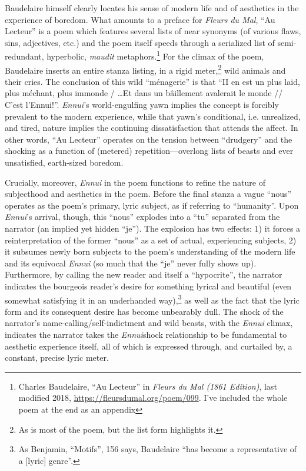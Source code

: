 \documentclass[12pt]{article}
\begin{document}
Baudelaire himself clearly locates his sense of modern life and of aesthetics in the experience of boredom. What amounts to a preface for \textit{Fleurs du Mal}, ``Au Lecteur'' is a poem which features several lists of near synonyms (of various flaws, sins, adjectives, etc.) and the poem itself speeds through a serialized list of semi-redundant, hyperbolic, \textit{maudit} metaphors.\footnote{Charles Baudelaire, ``Au Lecteur'' in \textit{Fleurs du Mal (1861 Edition)}, last modified 2018, \url{https://fleursdumal.org/poem/099}. I've included the whole poem at the end as an appendix} For the climax of the poem, Baudelaire inserts an entire stanza listing, in a rigid meter,\footnote{As is most of the poem, but the list form highlights it.} wild animals and their cries. The conclusion of this wild ``ménagerie'' is that ``II en est un plus laid, plus méchant, plus immonde / \dots  Et dans un bâillement avalerait le monde // C'est l'Ennui!''. \textit{Ennui}'s world-engulfing yawn implies the concept is forcibly prevalent to the modern experience, while that yawn's conditional, i.e. unrealized, and tired, nature implies the continuing dissatisfaction that attends the affect. In other words, ``Au Lecteur'' operates on the tension between ``drudgery'' and the shocking as a function of (metered) repetition---overlong lists of beasts and ever unsatisfied, earth-sized boredom.  

Crucially, moreover, \textit{Ennui} in the poem functions to refine the nature of subjecthood and aesthetics in the poem. Before the final stanza  a vague ``nous'' operates as the poem's primary, lyric subject, as if referring to ``humanity''. Upon \textit{Ennui}'s arrival, though, this ``nous'' explodes into a ``tu'' separated from the narrator (an implied yet hidden ``je''). The explosion has two effects: 1) it forces a reinterpretation of the former ``nous'' as a set of actual, experiencing subjects, 2) it subsumes newly born subjects to the poem's understanding of the modern life and its equivocal \textit{Ennui} (so much that the ``je'' never fully shows up). Furthermore, by calling the new reader and itself a ``hypocrite'', the narrator indicates the bourgeois reader's desire for something lyrical and beautiful (even somewhat satisfying it in an underhanded way),\footnote{As Benjamin, ``Motifs'', 156 says, Baudelaire ``has become a representative of a [lyric] genre''.} as well as the fact that the lyric form and its consequent desire has become unbearably dull. The shock of the narrator's name-calling/self-indictment and wild beasts, with the \textit{Ennui} climax, indicates the narrator takes the \textit{Ennui}\-shock relationship to be fundamental to aesthetic experience itself, all of which is expressed through, and curtailed by, a constant, precise lyric meter.
\end{document}
